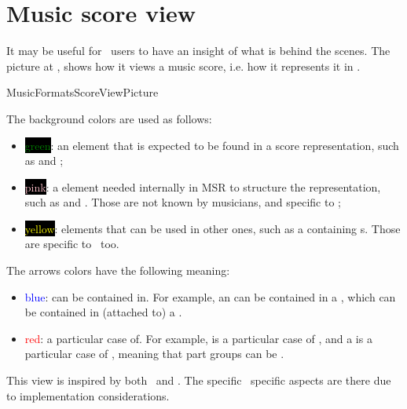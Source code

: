 
\chapter{Music score view}\label{Music score view}

It may be useful for \mf\ users to have an insight of what is behind the scenes.
The picture at , shows how it views a music score, i.e. how it represents it in \msrRepr.

{MusicFormatsScoreViewPicture}

The background colors are used as follows:
\begin{itemize}
\item \colorbox{black}{\textcolor{green}{green}}: an element that is expected to be found in a score representation, such as  and ;

\item \colorbox{black}{\textcolor{pink}{pink}}: a element needed internally in MSR to structure the representation, such as  and . Those are not known by musicians, and specific to \mf;

\item \colorbox{black}{\textcolor{yellow}{yellow}}: elements that can be used in other ones, such as a  containing s. Those are specific to \mf\ too.
\end{itemize}

The arrows colors have the following meaning:
\begin{itemize}
\item \textcolor{blue}{blue}: can be contained in. For example, an  can be contained in a , which can be contained in (attached to) a .

\item \textcolor{red}{red}: a particular case of. For example,  is a particular case of , and a  is a particular case of , meaning that part groups can be .
\end{itemize}

This view is inspired by both \mxml\ and \lily. The specific \mf\ specific aspects are there due to implementation considerations.
